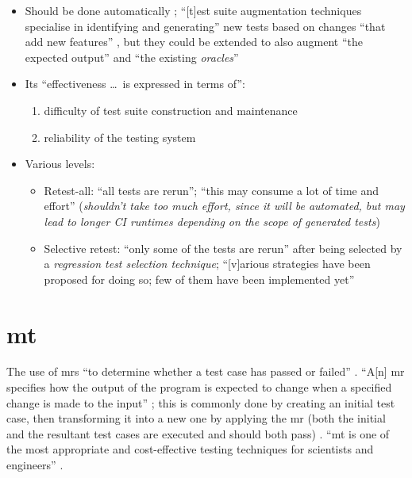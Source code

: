 \begin{itemize}
    \item Should be done automatically \citep[p.~481]{PetersAndPedrycz2000};
          ``[t]est suite augmentation techniques specialise in
          identifying and generating'' new tests based on changes ``that add
          new features'' , but they could be extended to
          also augment ``the expected output'' and ``the existing
          \emph{oracles}'' \citep[p.~516]{BarrEtAl2015}
    \item Its ``effectiveness \dots\ is expressed in terms of'':
          \begin{enumerate}
              \item difficulty of test suite construction and maintenance
              \item reliability of the testing system
                    \citep[pp.~481-482]{PetersAndPedrycz2000}
          \end{enumerate}
    \item Various levels:
          \begin{itemize}
              \item Retest-all: ``all tests are rerun''; ``this may consume
                    a lot of time and effort''
                    \citep[p.~411]{vanVliet2000} (\emph{shouldn't
                        take too much effort, since it will be automated,
                        but may lead to longer CI runtimes depending on
                        the scope of generated tests})
              \item Selective retest: ``only some of the tests are rerun''
                    after being selected by a \emph{regression test
                        selection technique}; ``[v]arious strategies have
                    been proposed for doing so; few of them have been
                    implemented yet'' \citep[p.~411]{vanVliet2000}
          \end{itemize}
\end{itemize}

\section[Metamorphic Testing (MT)]{\acf{mt}}
\label{chap:testing:sec:metamorphic-testing}
The use of \acfp{mr} ``to determine whether a test case has passed or failed''
\citep[p.~67]{KanewalaAndYuehChen2019}. ``A[n] \acs{mr} specifies how the
output of the program is expected to change when a specified change is made to
the input'' \citep[p.~67]{KanewalaAndYuehChen2019}; this is commonly done by
creating an initial test case, then transforming it into a new one by applying
the \acs{mr} (both the initial and the resultant test cases are executed and
should both pass) \citep[p.~68]{KanewalaAndYuehChen2019}. ``\acs{mt} is one of
the most appropriate and cost-effective testing techniques for scientists and
engineers'' \citep[p.~72]{KanewalaAndYuehChen2019}.

